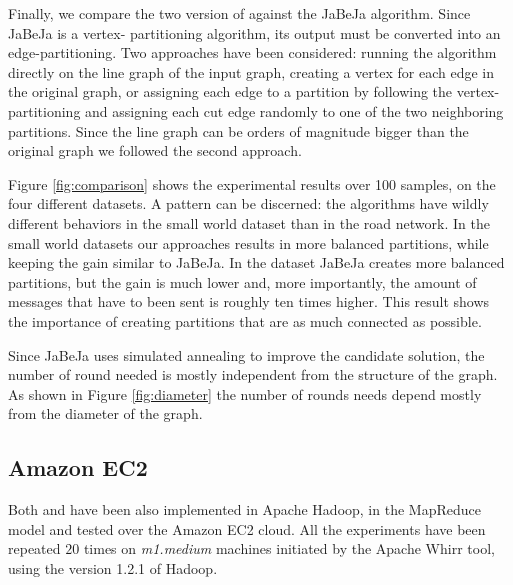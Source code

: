 Finally, we compare the 
two version of \dfep against the JaBeJa\cite{Rahimian2013} algorithm. Since JaBeJa is a vertex-
partitioning algorithm, its output must be converted into an edge-partitioning. 
Two approaches have been considered: running the algorithm directly on the line 
graph of the input graph, creating a vertex for each edge in the original graph, or 
assigning each edge to a partition by following the vertex-partitioning and 
assigning each cut edge randomly to one of the two neighboring partitions. Since 
the line graph can be orders of magnitude bigger than the original graph we followed the second approach.

Figure \ref{fig:comparison}
shows the experimental results over 100 samples, on the four different datasets.
A pattern can be discerned: the algorithms have wildly different behaviors in the 
small world dataset than in the road network. In the small world datasets our 
approaches results in more balanced partitions, while keeping the gain similar to 
JaBeJa. In the  dataset JaBeJa creates more balanced
partitions, but the gain is much lower and, more importantly, the amount of
messages that have to been sent is roughly ten times higher. This result shows
the importance of creating partitions that are as much connected as possible.

Since JaBeJa uses simulated annealing to improve the candidate solution, the
number of round needed is mostly independent from the structure of the graph.
As shown in Figure \ref{fig:diameter} the number of rounds \dfep needs depend mostly
from the diameter of the graph.



\subsection{Amazon EC2}

Both \dfep and \etsch have been also implemented in Apache Hadoop, in the
MapReduce model and tested over the Amazon EC2 cloud. All the experiments have
been repeated $20$ times on \emph{m1.medium} machines initiated by the Apache
Whirr tool, using the version 1.2.1 of Hadoop.

